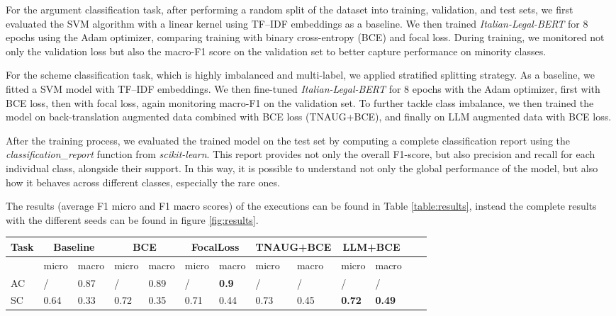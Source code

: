 \documentclass[11pt]{article}
\begin{document}
For the argument classification task, after performing a random split of the dataset into training, validation, and test sets, we first evaluated the SVM algorithm with a linear kernel using TF–IDF embeddings as a baseline. We then trained \textit{Italian-Legal-BERT} for 8 epochs using the Adam optimizer, comparing training with binary cross-entropy (BCE) and focal loss. During training, we monitored not only the validation loss but also the macro-F1 score on the validation set to better capture performance on minority classes.

For the scheme classification task, which is highly imbalanced and multi-label, we applied stratified splitting strategy. As a baseline, we fitted a SVM model with TF–IDF embeddings. We then fine-tuned \textit{Italian-Legal-BERT} for 8 epochs with the Adam optimizer, first with BCE loss, then with focal loss, again monitoring macro-F1 on the validation set. To further tackle class imbalance, we then trained the model on back-translation augmented data combined with BCE loss (TNAUG+BCE), and finally on LLM augmented data with BCE loss. 

After the training process, we evaluated the trained model on the test set by computing a complete classification report using the \textit{classification\_report} function from \textit{scikit-learn}. This report provides not only the overall F1-score, but also precision and recall for each individual class, alongside their support. In this way, it is possible to understand not only the global performance of the model, but also how it behaves across different classes, especially the rare ones.

The results (average F1 micro and F1 macro scores) of the executions can be found in Table \ref{table:results}, instead the complete results with the different seeds can be found in figure \ref{fig:results}. 


\begin{table*}[ht]
    \centering
    \begin{tabular}{|l|l|l|l|l|l|l|l|l|l|l|l|l|}
    \hline
        Task & \multicolumn{2}{c}{Baseline} & \multicolumn{2}{c}{BCE} & \multicolumn{2}{c}{FocalLoss} & \multicolumn{2}{c}{TNAUG+BCE} & \multicolumn{2}{c}{LLM+BCE} \\ \hline
        ~ & micro & macro & micro & macro & micro & macro & micro & macro & micro & macro \\ \hline
        AC & / & 0.87 & / & 0.89 & / & \textbf{0.9} & / & / & / & / \\ \hline
        SC & 0.64 & 0.33 & 0.72 & 0.35 & 0.71 & 0.44 & 0.73 & 0.45 & \textbf{0.72} & \textbf{0.49} \\ \hline
    \end{tabular}
    \caption{Average score over the 3 seeds for AC and SC}
    \label{table:results}
\end{table*}
\end{document}
